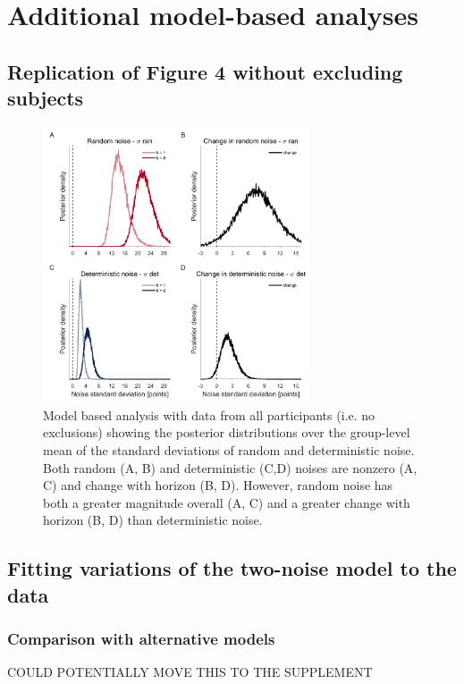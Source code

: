 \documentclass[12pt]{article}
\begin{document}
	\section{Additional model-based analyses}
	\subsection{Replication of Figure 4 without excluding subjects}
	\begin{figure}[H]
		\begin{center}
			\includegraphics[width=0.7\textwidth]{figures/RDBayes_hyperprior__all.jpg}
			\caption{Model based analysis with data from all participants (i.e. no exclusions) showing the posterior distributions over the group-level mean of the standard deviations of  random and deterministic noise. Both random (A, B) and deterministic (C,D) noises are nonzero (A, C) and change with horizon (B, D).  However, random noise has both a greater magnitude overall (A, C) and a greater change with horizon (B, D) than deterministic noise.}
			\label{fig:s8}
		\end{center}
	\end{figure}
	\newpage
	\subsection{Fitting variations of the two-noise model to the data}
	
	\subsubsection*{Comparison with alternative models}
	COULD POTENTIALLY MOVE THIS TO THE SUPPLEMENT
	
\end{document}
